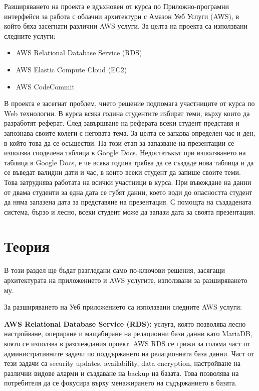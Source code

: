\documentclass[12pt]{article}
\begin{document}
\noindent Разширяването на проекта е вдъхновен от курса по Приложно-програмни интерфейси за работа с облачни архитектури с Амазон Уеб Услуги (AWS), в който бяха засегнати различни AWS услуги. За целта на проекта са използвани следните услуги:
\begin{itemize}
    \item AWS Relational Database Service (RDS)
    
    \item AWS Elastic Compute Cloud (EC2)
    
    \item AWS CodeCommit
\end{itemize}

\noindent В проекта е засегнат проблем, чието решение подпомага участниците от курса по Web технологии. В курса всяка година студентите избират теми, върху които да разработят реферат. След завършване на реферата всеки студент представя и запознава своите колеги с неговата тема. За целта се запазва определен час и ден, в който това да се осъществи. На този етап за запазване на презентации се използва споделена таблица в Google Docs. Недостатъкът при използването на таблица в Google Docs, е че всяка година трябва да се създаде нова таблица и да се въведат валидни дати и час, в които всеки студент да запише своите теми. Това затруднява работата на всички участници в курса. При въвеждане на данни от двама студенти за една дата се губят данни, което води до опасността студент да няма запазена дата за представяне на презентация. С помощта на създадената система, бързо и лесно, всеки студент може да запази дата за своята презентация. 

\section{Теория}
\noindent В този раздел ще бъдат разгледани само по-ключови решения, засягащи архитектурата на приложението и AWS услугите, използвани за разширяването му.
\medskip

\noindent За разширяването на Уеб приложението са използвани следните AWS услуги:  
\medskip

\noindent \textbf{AWS Relational Database Service (RDS):} услуга, която позволява лесно настройване, опериране и мащабиране на релационни бази данни като MariaDB, която се използва в разглеждания проект. AWS RDS се грижи за голяма част от административните задачи по поддържането на релационната база данни. Част от тези задачи са security updates, availability, data encryption, настройване на различни видове аларми и създаване на backup на базата. Това позволява на потребителя да се фокусира върху менажирането на съдържанието в базата.
\medskip
\end{document}
